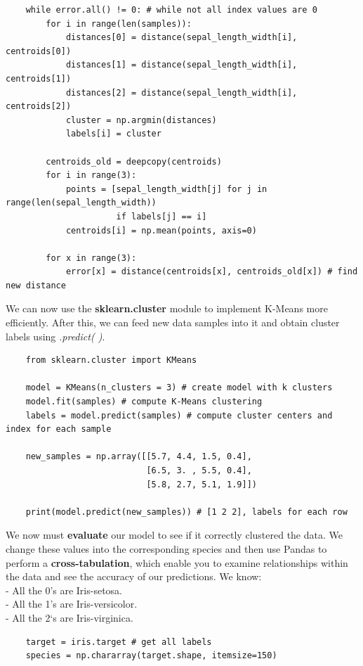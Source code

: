 \documentclass[11pt, a4paper]{article}
\begin{document}
\begin{spacing}{1.1}
\begin{lstlisting}
	while error.all() != 0: # while not all index values are 0
		for i in range(len(samples)):
			distances[0] = distance(sepal_length_width[i], centroids[0])
			distances[1] = distance(sepal_length_width[i], centroids[1])
			distances[2] = distance(sepal_length_width[i], centroids[2])
			cluster = np.argmin(distances)
			labels[i] = cluster
		
		centroids_old = deepcopy(centroids)
		for i in range(3):
			points = [sepal_length_width[j] for j in range(len(sepal_length_width)) 
			          if labels[j] == i]
			centroids[i] = np.mean(points, axis=0)
		
		for x in range(3):
			error[x] = distance(centroids[x], centroids_old[x]) # find new distance	\end{lstlisting} \vspace*{1mm}
	We can now use the \textbf{sklearn.cluster} module to implement K-Means more efficiently. After this, we can feed new data samples into it and obtain cluster labels using \textit{.predict( )}. 
	\begin{lstlisting}
	from sklearn.cluster import KMeans
	
	model = KMeans(n_clusters = 3) # create model with k clusters
	model.fit(samples) # compute K-Means clustering
	labels = model.predict(samples) # compute cluster centers and index for each sample	
	
	new_samples = np.array([[5.7, 4.4, 1.5, 0.4],
	                        [6.5, 3. , 5.5, 0.4],
	                        [5.8, 2.7, 5.1, 1.9]])
	 
	print(model.predict(new_samples)) # [1 2 2], labels for each row \end{lstlisting} \vspace*{1mm}
	We now must \textbf{evaluate} our model to see if it correctly clustered the data. We change these values into the corresponding species and then use Pandas to perform a \textbf{cross-tabulation}, which enable you to examine relationships within the data and see the accuracy of our predictions. We know: \\
	\hspace*{3mm} - All the 0's are Iris-setosa. \\
	\hspace*{3mm} - All the 1's are Iris-versicolor. \\
	\hspace*{3mm} - All the 2‘s are Iris-virginica. \newpage

	\begin{lstlisting}
	target = iris.target # get all labels
	species = np.chararray(target.shape, itemsize=150)
	

\end{lstlisting}
\end{spacing}
\end{document}

